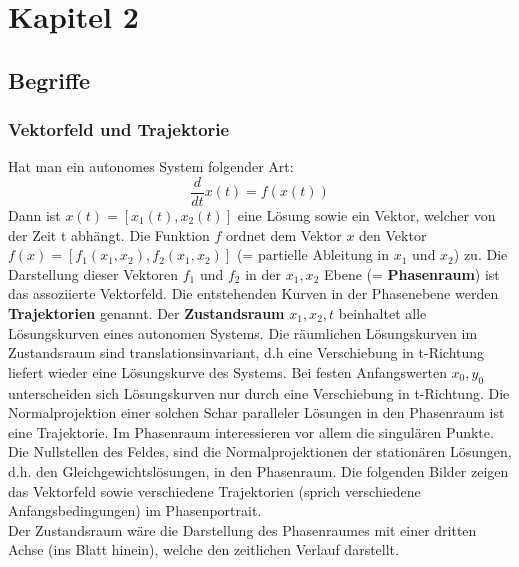 \section{Kapitel 2}

\subsection{Begriffe}
\subsubsection{Vektorfeld und Trajektorie}
Hat man ein autonomes System folgender Art:
\begin{equation*}
\frac{d}{dt}x(t) = f(x(t))
\end{equation*}
Dann ist $x(t) = [x_1(t), x_2(t)]$ eine Lösung sowie ein Vektor, welcher von der Zeit t abhängt. Die Funktion $f$ ordnet dem Vektor $x$ den Vektor $f(x) = [f_1(x_1,x_2),f_2(x_1,x_2)]$ (= partielle Ableitung in $x_1$ und $x_2$) zu. 
Die Darstellung dieser Vektoren $f_1$ und $f_2$ in der $x_1,x_2$ Ebene (= \textbf{Phasenraum}) ist das assoziierte Vektorfeld. 
Die entstehenden Kurven in der Phasenebene werden \textbf{Trajektorien} genannt. 
Der \textbf{Zustandsraum} $x_1,x_2,t$ beinhaltet alle Lösungskurven eines autonomen Systems.
Die räumlichen Lösungskurven im Zustandsraum sind translationsinvariant, d.h eine Verschiebung in t-Richtung liefert wieder eine Lösungskurve des Systems. Bei festen Anfangswerten $x_0, y_0$ unterscheiden sich Lösungskurven nur durch eine Verschiebung in t-Richtung. Die Normalprojektion einer solchen Schar paralleler Lösungen in den Phasenraum ist eine Trajektorie. 
Im Phasenraum interessieren vor allem die singulären Punkte. Die Nullstellen des Feldes, sind die Normalprojektionen der stationären Lösungen, d.h. den Gleichgewichtslösungen, in den Phasenraum. 
Die folgenden Bilder zeigen das Vektorfeld sowie verschiedene Trajektorien (sprich verschiedene Anfangsbedingungen) im Phasenportrait.\\  
Der Zustandsraum wäre die Darstellung des Phasenraumes mit einer dritten Achse (ins Blatt hinein), welche den zeitlichen Verlauf darstellt.\\

